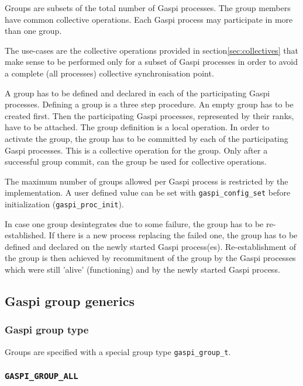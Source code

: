 \documentclass[a4paper]{article}
\newcommand{\secref}[1]{section\xspace\ref{#1}}
\newlength{\st}\setlength{\st}{0pt}
\newcommand{\zsep}[1]{#1}
\newcommand{\gaspiprefix}{gaspi}
\newcommand{\GASPI}{{\sc Gaspi}}
\newcommand{\function}[1]{{\tt #1}}
\newcommand{\gaspifunction}[1]{\function{\protect\zsep{\gaspiprefix\_#1}}}
\newcommand{\GASPIGROUPALL}{{\tt\protect\zsep{GASPI\_GROUP\_ALL}}}
\begin{document}
Groups are subsets of the total number of \GASPI{} processes. The group members
have common collective operations.  Each \GASPI{} process may participate in more
than one group.

The use-cases are the collective operations provided in \secref{sec:collectives}
that make sense to be performed only for a subset of \GASPI{} processes
in order to avoid a complete (all processes) collective synchronisation
point.

A group has to be defined and declared in each of the participating
\GASPI{} processes. Defining a group is a three step procedure.  An
empty group has to be created first. Then the participating \GASPI{}
processes, represented by their ranks, have to be attached. The group
definition is a local operation.  In order to activate the group, the
group has to be committed by each of the participating \GASPI{}
processes. This is a collective operation for the group. Only after a
successful group commit, can the group be used for collective
operations.

The maximum number of groups allowed per \GASPI{} process is
restricted by the implementation. A user defined value can be set with
\gaspifunction{config\_set} before initialization
(\gaspifunction{proc\_init}).

In case one group desintegrates due to some failure, the group has to
be re-established. If there is a new process replacing the failed one,
the group has to be defined and declared on the newly started \GASPI{}
process(es).  Re-establishment of the group is then achieved by
recommitment of the group by the \GASPI{} processes which were still
'alive' (functioning) and by the newly started \GASPI{} process.

\subsection{\GASPI{} group generics}

\subsubsection{\GASPI{} group type}

Groups are specified with a special group type \verb|gaspi_group_t|.

\subsubsection{\GASPIGROUPALL{}}
\end{document}
